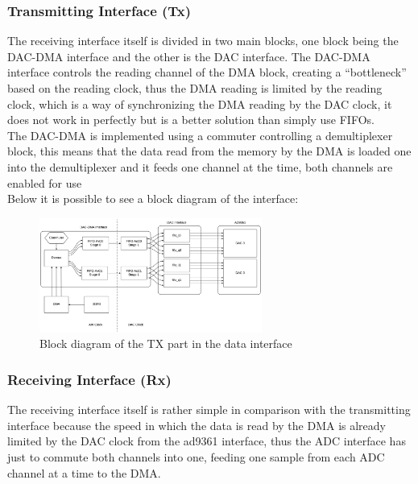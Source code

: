 \subsubsection{Transmitting Interface (Tx)}

The receiving interface itself is divided in two main blocks, one block being the
DAC-DMA interface and the other is the DAC interface. The DAC-DMA interface controls
the reading channel of the DMA block, creating a “bottleneck” based on the reading
clock, thus the DMA reading is limited by the reading clock, which is a way of
synchronizing the DMA reading by the DAC clock, it does not work in perfectly but
is a better solution than simply use FIFOs. \\

The DAC-DMA is implemented using a commuter controlling a demultiplexer block,
this means that the data read from the memory by the DMA is loaded one into the
demultiplexer and it feeds one channel at the time, both channels are enabled
for use\\

Below it is possible to see a block diagram of the interface:

\begin{figure}[htbp]
    \centering
    \includegraphics[width=0.65\textwidth]{./figures/txdata_if}
    \caption{ Block diagram of the TX part in the data interface
    \label{fig:dataiftx}}
\end{figure}

\subsubsection{Receiving Interface (Rx)}

The receiving interface itself is rather simple in comparison with the transmitting
interface because the speed in which the data is read by the DMA is already limited
by the DAC clock from the ad9361 interface, thus the ADC interface has just to commute
both channels into one, feeding one sample from each ADC channel at a time to the DMA.\\

